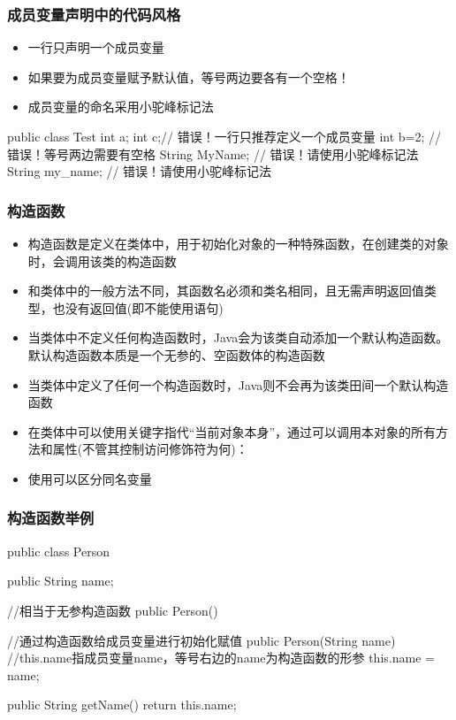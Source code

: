 \begin{frame}[fragile]
  \frametitle{成员变量声明中的代码风格}
  \begin{itemize}
    \item 一行只声明一个成员变量
    \item 如果要为成员变量赋予默认值，等号两边要各有一个空格！
    \item 成员变量的命名采用小驼峰标记法
  \end{itemize}
  \begin{javacode}
    public class Test {
      int a; int c;// 错误！一行只推荐定义一个成员变量
      int b=2; // 错误！等号两边需要有空格
      String MyName; // 错误！请使用小驼峰标记法
      String my_name; // 错误！请使用小驼峰标记法
   }
  \end{javacode}
\end{frame}

\begin{frame}[fragile]
  \frametitle{构造函数}
  \begin{itemize}
    \item 构造函数是定义在类体中，用于初始化对象的一种特殊函数，在创建类的对象时，会调用该类的构造函数
    \item 和类体中的一般方法不同，其函数名必须和类名相同，且无需声明返回值类型，也没有返回值(即不能使用语句)
    \item 当类体中不定义任何构造函数时，Java会为该类自动添加一个默认构造函数。默认构造函数本质是一个无参的、空函数体的构造函数
    \item 当类体中定义了任何一个构造函数时，Java则不会再为该类田间一个默认构造函数
    \item 在类体中可以使用关键字指代“当前对象本身”，通过可以调用本对象的所有方法和属性(不管其控制访问修饰符为何)：
    \item 使用可以区分同名变量
  \end{itemize}
\end{frame}

\begin{frame}[fragile]
  \frametitle{构造函数举例}
  \begin{javacode}
    public class Person {
      public String name;
      
      //相当于无参构造函数
      public Person(){
      }
      
      //通过构造函数给成员变量进行初始化赋值
      public Person(String name) {
        //this.name指成员变量name，等号右边的name为构造函数的形参
        this.name = name; 
      }
      
      public String getName() {
        return this.name;
      }
    }  
  \end{javacode}
\end{frame}


